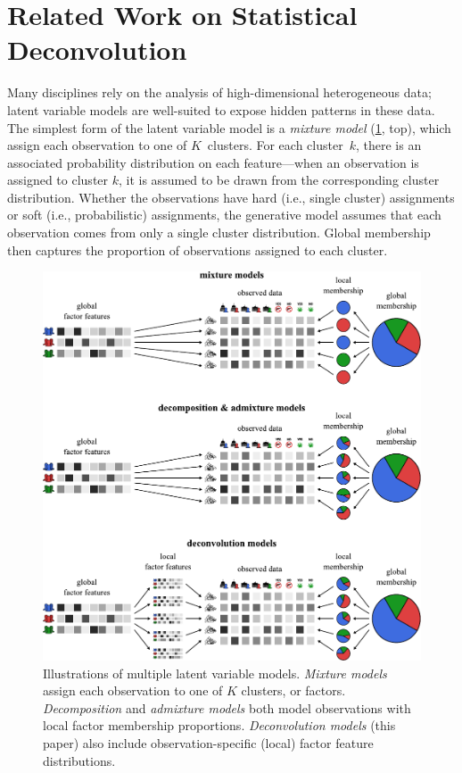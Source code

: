 \documentclass[twoside,11pt]{article}
\begin{document}
\section{Related Work on Statistical Deconvolution}
\label{sec:related_work}
Many disciplines rely on the analysis of high-dimensional heterogeneous data; latent variable models are well-suited to expose hidden patterns in these data.  The simplest form of the latent variable model is a \emph{mixture model} (\cref{fig:cartoon}, top), which assign each observation to one of $K$~clusters.  For each cluster~$k$, there is an associated probability distribution on each feature---when an observation is assigned to cluster $k$, it is assumed to be drawn from the corresponding cluster distribution. Whether the observations have hard (i.e., single cluster) assignments or soft (i.e., probabilistic) assignments, the generative model assumes that each observation comes from only a single cluster distribution. Global membership then captures the proportion of observations assigned to each cluster.

\begin{figure}
\centering
\includegraphics[width=\textwidth]{cartoon.pdf}
\vspace{10px}
\caption{Illustrations of multiple latent variable models.  
\emph{Mixture models} assign each observation to one of $K$ clusters, or factors.  
\emph{Decomposition} and \emph{admixture models} both model observations with local factor membership proportions.
\emph{Deconvolution models} (this paper) also include observation-specific (local) factor feature distributions.}
\label{fig:cartoon}
\end{figure}
\end{document}
